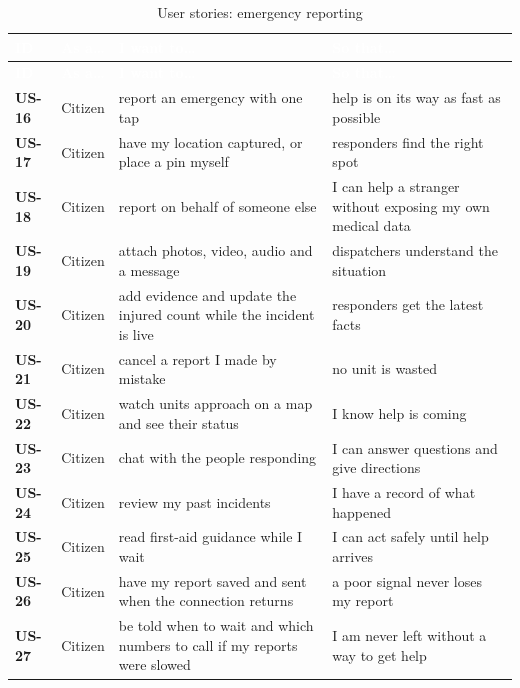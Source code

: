 {\tabfont\rowband
\begin{longtable}{@{}>{\raggedright\arraybackslash}p{}>{\raggedright\arraybackslash}p{}>{\raggedright\arraybackslash}p{}>{\raggedright\arraybackslash}p{}@{}}
\caption{User stories: emergency reporting}\label{tab:us-rep}\\
\rowcolor{najdanavy}\textcolor{white}{\sffamily\bfseries\small ID} & \textcolor{white}{\sffamily\bfseries\small As a\ldots{}} & \textcolor{white}{\sffamily\bfseries\small I want to\ldots{}} & \textcolor{white}{\sffamily\bfseries\small So that\ldots{}}\\
\endfirsthead
\rowcolor{najdanavy}\textcolor{white}{\sffamily\bfseries\small ID} & \textcolor{white}{\sffamily\bfseries\small As a\ldots{}} & \textcolor{white}{\sffamily\bfseries\small I want to\ldots{}} & \textcolor{white}{\sffamily\bfseries\small So that\ldots{}}\\
\endhead
\bottomrule\endlastfoot
\textbf{US-16} & Citizen & report an emergency with one tap & help is on its way as fast as possible\\
\textbf{US-17} & Citizen & have my location captured, or place a pin myself & responders find the right spot\\
\textbf{US-18} & Citizen & report on behalf of someone else & I can help a stranger without exposing my own medical data\\
\textbf{US-19} & Citizen & attach photos, video, audio and a message & dispatchers understand the situation\\
\textbf{US-20} & Citizen & add evidence and update the injured count while the incident is live & responders get the latest facts\\
\textbf{US-21} & Citizen & cancel a report I made by mistake & no unit is wasted\\
\textbf{US-22} & Citizen & watch units approach on a map and see their status & I know help is coming\\
\textbf{US-23} & Citizen & chat with the people responding & I can answer questions and give directions\\
\textbf{US-24} & Citizen & review my past incidents & I have a record of what happened\\
\textbf{US-25} & Citizen & read first-aid guidance while I wait & I can act safely until help arrives\\
\textbf{US-26} & Citizen & have my report saved and sent when the connection returns & a poor signal never loses my report\\
\textbf{US-27} & Citizen & be told when to wait and which numbers to call if my reports were slowed & I am never left without a way to get help\\
\end{longtable}}
